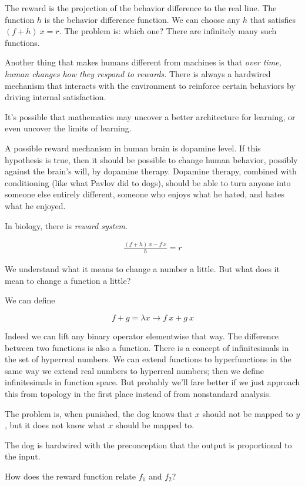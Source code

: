 The reward is the projection of the behavior difference to the real line.
The function \(h\) is the behavior difference function.
We can choose any \(h\) that satisfies \((f + h)~x = r\).
The problem is: which one?
There are infinitely many such functions.

Another thing that makes humans different from machines is that
\emph{over time, human changes how they respond to rewards.}
There is always a hardwired mechanism that interacts with the environment
to reinforce certain behaviors by driving internal satisfaction.

It's possible that mathematics may uncover a better architecture for learning,
or even uncover the limits of learning.

A possible reward mechanism in human brain is dopamine level.
If this hypothesis is true, then it should be possible to change human behavior,
possibly against the brain's will, by dopamine therapy.
Dopamine therapy, combined with conditioning (like what Pavlov did to dogs),
should be able to turn anyone into someone else entirely different,
someone who enjoys what he hated, and hates what he enjoyed.

In biology, there is \emph{reward system}.

\begin{align*}
    \frac{(f + h)~x - f~x}{h} = r
\end{align*}

We understand what it means to change a number a little.
But what does it mean to change a function a little?

We can define

\[
    f + g = \lambda x \to f~x+g~x
\]

Indeed we can lift any binary operator elementwise that way.
The difference between two functions is also a function.
There is a concept of infinitesimals in the set of hyperreal numbers.
We can extend functions to hyperfunctions in the same way
we extend real numbers to hyperreal numbers;
then we define infinitesimals in function space.
But probably we'll fare better if we just approach this from topology
in the first place instead of from nonstandard analysis.

The problem is, when punished, the dog knows that
\(x\) should not be mapped to \(y\),
but it does not know what \(x\) should be mapped to.

The dog is hardwired with the preconception that the output is proportional to the input.

How does the reward function relate \(f_1\) and \(f_2\)?

